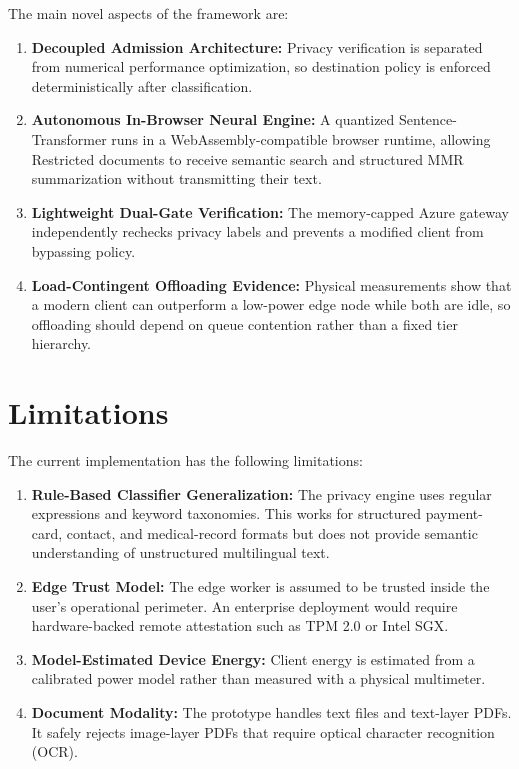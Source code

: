 \documentclass[conference]{IEEEtran}
\begin{document}
The main novel aspects of the framework are:
\begin{enumerate}
  \item \textbf{Decoupled Admission Architecture:} Privacy verification is separated from numerical performance optimization, so destination policy is enforced deterministically after classification.
  \item \textbf{Autonomous In-Browser Neural Engine:} A quantized Sentence-Transformer runs in a WebAssembly-compatible browser runtime, allowing Restricted documents to receive semantic search and structured MMR summarization without transmitting their text.
  \item \textbf{Lightweight Dual-Gate Verification:} The memory-capped Azure gateway independently rechecks privacy labels and prevents a modified client from bypassing policy.
  \item \textbf{Load-Contingent Offloading Evidence:} Physical measurements show that a modern client can outperform a low-power edge node while both are idle, so offloading should depend on queue contention rather than a fixed tier hierarchy.
\end{enumerate}
\section{Limitations}

The current implementation has the following limitations:
\begin{enumerate}
  \item \textbf{Rule-Based Classifier Generalization:} The privacy engine uses regular expressions and keyword taxonomies. This works for structured payment-card, contact, and medical-record formats but does not provide semantic understanding of unstructured multilingual text.
  \item \textbf{Edge Trust Model:} The edge worker is assumed to be trusted inside the user's operational perimeter. An enterprise deployment would require hardware-backed remote attestation such as TPM 2.0 or Intel SGX.
  \item \textbf{Model-Estimated Device Energy:} Client energy is estimated from a calibrated power model rather than measured with a physical multimeter.
  \item \textbf{Document Modality:} The prototype handles text files and text-layer PDFs. It safely rejects image-layer PDFs that require optical character recognition (OCR).
\end{enumerate}
\end{document}
